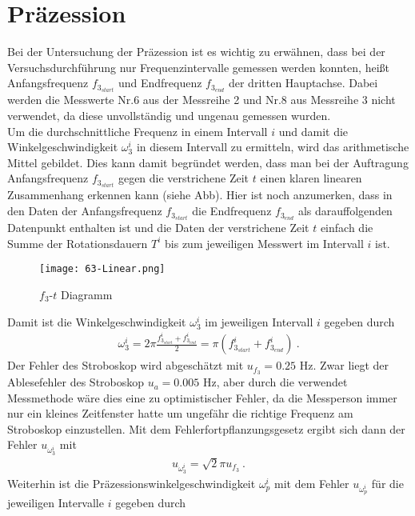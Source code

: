 

\section{Präzession}

Bei der Untersuchung der Präzession ist es wichtig zu erwähnen, dass bei der Versuchsdurchführung nur Frequenzintervalle gemessen werden konnten, heißt Anfangsfrequenz $f_{3_{start}}$ und Endfrequenz $f_{3_{end}}$ der dritten Hauptachse. Dabei werden die Messwerte Nr.6 aus der Messreihe 2 und Nr.8 aus Messreihe 3 nicht verwendet, da diese unvollständig und ungenau gemessen wurden. \\
Um die durchschnittliche Frequenz in einem Intervall $i$ und damit die Winkelgeschwindigkeit $\omega_3^i$ in diesem Intervall zu ermitteln, wird das arithmetische Mittel gebildet. Dies kann damit begründet werden, dass man bei der Auftragung Anfangsfrequenz $f_{3_{start}}$ gegen die verstrichene Zeit $t$ einen klaren linearen Zusammenhang erkennen kann (siehe Abb). Hier ist noch anzumerken, dass in den Daten der Anfangsfrequenz $f_{3_{start}}$ die Endfrequenz $f_{3_{end}}$ als darauffolgenden Datenpunkt enthalten ist und die Daten der verstrichene Zeit $t$ einfach die Summe der Rotationsdauern $T^i$ bis zum jeweiligen Messwert im Intervall $i$ ist.
\begin{figure}[ht]
    \centering
    \caption{$f_3$-$t$ Diagramm}
    \texttt{[image: 63-Linear.png]}
\end{figure}
Damit ist die Winkelgeschwindigkeit $\omega_3^i$ im jeweiligen Intervall $i$ gegeben durch 
\begin{align}
    \omega_3^i=2\pi\frac{f_{3_{start}}^i+f_{3_{end}}^i}{2}=\pi(f_{3_{start}}^i+f_{3_{end}}^i)~.
\end{align}
Der Fehler des Stroboskop wird abgeschätzt mit $u_{f_3} = 0.25$ Hz. Zwar liegt der Ablesefehler des Stroboskop $u_a = 0.005$ Hz, aber durch die verwendet Messmethode wäre dies eine zu optimistischer Fehler, da die Messperson immer nur ein kleines Zeitfenster hatte um ungefähr die richtige Frequenz am Stroboskop einzustellen. Mit dem Fehlerfortpflanzungsgesetz ergibt sich dann der Fehler $u_{\omega_3^i}$ mit
\begin{align}
    u_{\omega_3^i}=\sqrt{2}\pi u_{f_3}~.
\end{align}
Weiterhin ist die Präzessionswinkelgeschwindigkeit $\omega_p^i$ mit dem Fehler $u_{\omega_p^i}$ für die jeweiligen Intervalle $i$ gegeben durch 
